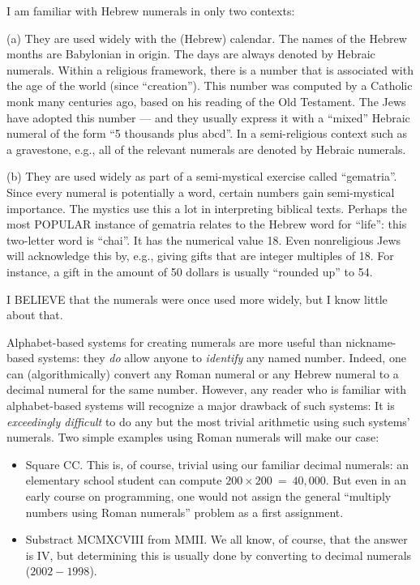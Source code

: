 {}  {\ignore
{\Arny I am familiar with Hebrew numerals in only two contexts:

(a) They are used widely with the (Hebrew) calendar.  The names of the
  Hebrew months are Babylonian in origin.  The days are always
  denoted by Hebraic numerals.  Within a religious framework, there is
  a number that is associated with the age of the world (since
  ``creation'').  This number was computed by a Catholic monk many
  centuries ago, based on his reading of the Old Testament.  The Jews
  have adopted this number --- and they usually express it with a
  ``mixed'' Hebraic numeral of the form ``5 thousands plus abcd''.  In
  a semi-religious context such as a gravestone, e.g., all of the
  relevant numerals are denoted by Hebraic numerals.

(b) They are used widely as part of a semi-mystical exercise called
  ``gematria''.  Since every numeral is potentially a word, certain
  numbers gain semi-mystical importance.  The mystics use this a lot
  in interpreting biblical texts.  Perhaps the most POPULAR instance
  of gematria relates to the Hebrew word for ``life'': this two-letter
  word is ``chai''.  It has the numerical value 18.  Even nonreligious
  Jews will acknowledge this by, e.g., giving gifts that are integer
  multiples of 18.  For instance, a gift in the amount of 50 dollars is
  usually ``rounded up'' to 54.

I BELIEVE that the numerals were once used more widely, but I know
little about that.}}

Alphabet-based systems for creating numerals are more useful than
nickname-based systems: they {\em do} allow anyone to {\em identify}
any named number. Indeed, one can (algorithmically) convert any Roman
numeral or any Hebrew numeral to a decimal numeral for the same
number.  However, any reader who is familiar with alphabet-based
systems will recognize a major drawback of such systems: It is {\em
  exceedingly difficult} to do any but the most trivial arithmetic
using such systems' numerals.  Two simple examples using Roman
numerals will make our case:
\begin{itemize}
\item
Square CC.  This is, of course, trivial using our familiar decimal
numerals: an elementary school student can compute $200 \times 200 \ =
\ 40,000$.  But even in an early course on programming, one would not
assign the general ``multiply numbers using Roman numerals'' problem
as a first assignment.

\item
Substract MCMXCVIII from MMII.  We all know, of course, that the answer
is IV, but determining this is usually done by converting to decimal numerals
($2002-1998$).
\end{itemize}

